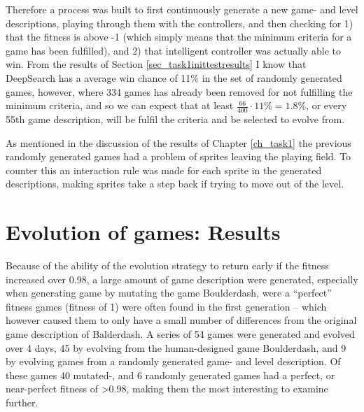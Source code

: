 \documentclass[a4paper,titlepage,final]{report}
\begin{document}
Therefore a process was built to first continuously generate a new game- and level descriptions, playing through them with the controllers, and then checking for 1) that the fitness is above -1 (which simply means that the minimum criteria for a game has been fulfilled), and 2) that intelligent controller was actually able to win.
From the results of Section \ref{sec_task1inittestresults} I know that DeepSearch has a average win chance of 11\% in the set of randomly generated games, however, where 334 games has already been removed for not fulfilling the minimum criteria, and so we can expect that at least $\frac{66}{400}\cdot 11\% = 1.8\%$, or every 55th game description, will be fulfil the criteria and be selected to evolve from.

As mentioned in the discussion of the results of Chapter \ref{ch_task1} the previous randomly generated games had a problem of sprites leaving the playing field.
To counter this an interaction rule was made for each sprite in the generated descriptions, making sprites take a step back if trying to move out of the level.

%
%
%


\section{Evolution of games: Results}
\label{sec_task2evolvingGamesResults}
Because of the ability of the evolution strategy to return early if the fitness increased over 0.98, a large amount of game description were generated, especially when generating game by mutating the game Boulderdash, were a ``perfect'' fitness games (fitness of 1) were often found in the first generation -- which however caused them to only have a small number of differences from the original game description of Balderdash.
A series of 54 games were generated and evolved over 4 days, 45 by evolving from the human-designed game Boulderdash, and 9 by evolving games from a randomly generated game- and level description.
Of these games 40 mutated-, and 6 randomly generated games had a perfect, or near-perfect fitness of >0.98, making them the most interesting to examine further.
\end{document}
